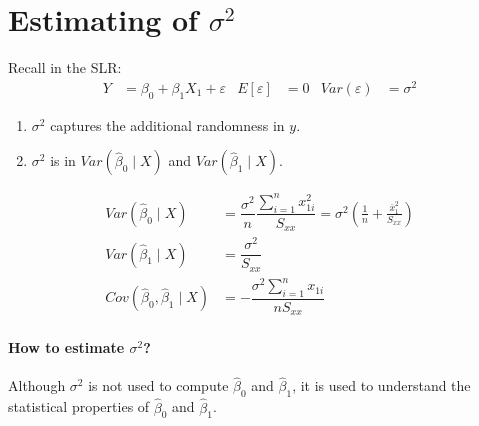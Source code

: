 \documentclass[12 pt]{article}
\begin{document}
\section{Estimating of $\sigma^2$}
Recall in the SLR:
\begin{align*}
  Y & = \beta_0 + \beta_1 X_1 + \varepsilon & E[\varepsilon] & = 0 & Var(\varepsilon) & = \sigma^2
\end{align*}
\begin{enumerate}
\item $\sigma^2$ captures the additional randomness in $y$.
\item $\sigma^2$ is in $Var(\hat{\beta}_0 \mid X)$ and
  $Var(\hat{\beta}_1 \mid X)$.
\end{enumerate}
\begin{align*}
  Var(\hat{\beta}_0 \mid X) & = \dfrac{\sigma^2}{n} \dfrac{\sum_{i=1}^n x_{1i}^2}{S_{xx}} = \sigma^2 \left( \frac{1}{n} + \frac{\overline{x}_1^2}{S_{xx}}\right)
  \\ Var(\hat{\beta}_1 \mid X) & = \dfrac{\sigma^2}{S_{xx}}
  \\ Cov(\hat{\beta}_0, \hat{\beta}_1 \mid X) & = -\dfrac{\sigma^2 \sum_{i=1}^nx_{1i}}{n S_{xx}}
\end{align*}
\paragraph{How to estimate $\sigma^2$?} Although $\sigma^2$ is not
used to compute $\hat{\beta}_0$ and $\hat{\beta}_1$, it is used to
understand the statistical properties of $\hat{\beta}_0$ and
$\hat{\beta}_1$.
\end{document}
